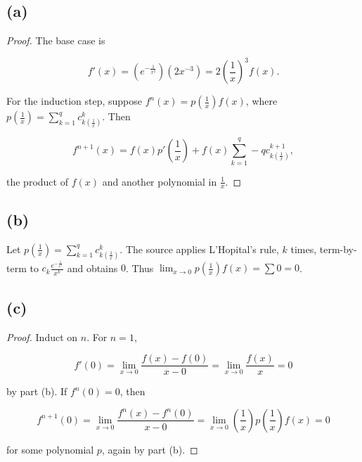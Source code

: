 \subsection{(a)}

\begin{proof}

The base case is

\[f'(x) = \left( e^{- \frac{1}{x^{2}}} \right)\left( {2x^{- 3}} \right) = 2\left( \frac{1}{x} \right)^{3}f(x).\]

For the induction step, suppose \(f^{n}(x) = p\left( \frac{1}{x} \right)f(x)\), where \(p\left( \frac{1}{x} \right) = \sum_{k = 1}^{q}c_{k{(\frac{1}{x})}}^{k}\). Then

\[f^{n + 1}(x) = f(x)p'\left( \frac{1}{x} \right) + f(x)\sum\limits_{k = 1}^{q} - qc_{k{(\frac{1}{x})}}^{k + 1},\]

the product of \(f(x)\) and another polynomial in \(\frac{1}{x}\).

\end{proof}

\subsection{(b)}

Let \(p\left( \frac{1}{x} \right) = \sum_{k = 1}^{q}c_{k{(\frac{1}{x})}}^{k}\). The source applies L'Hopital's rule, \(k\) times, term-by-term to \(c_{k}\frac{e^{- \frac{1}{x^{2}}}}{x^{k}}\) and obtains \(0\). Thus \(\lim_{x\rightarrow 0}p\left( \frac{1}{x} \right)f(x) = \sum 0 = 0\).

\subsection{(c)}

\begin{proof}

Induct on \(n\). For \(n = 1\),

\[f'(0) = \lim\limits_{x\rightarrow 0}\frac{f(x) - f(0)}{x - 0} = \lim\limits_{x\rightarrow 0}\frac{f(x)}{x} = 0\]

by part (b). If \(f^{n}(0) = 0\), then

\[f^{n + 1}(0) = \lim\limits_{x\rightarrow 0}\frac{f^{n}(x) - f^{n}(0)}{x - 0} = \lim\limits_{x\rightarrow 0}\left( \frac{1}{x} \right)p\left( \frac{1}{x} \right)f(x) = 0\]

for some polynomial \(p\), again by part (b).

\end{proof}

